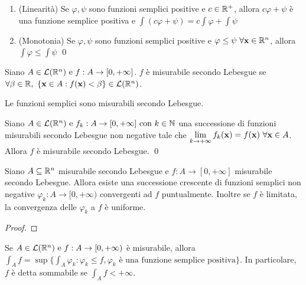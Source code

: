 \begin{theorem}
	\leavevmode
	\begin{enumerate}
		\item (Linearità) Se $\varphi,\psi$ sono funzioni semplici positive e $c\in \mathbb{R}^+$, allora $c\varphi + \psi$ è una funzione semplice positiva e $\int(c\varphi + \psi)=c\int\varphi +\int\psi$
		\item (Monotonia) Se $\varphi, \psi$ sono funzioni semplici positive e $\varphi \leq \psi \ \forall \vb{x} \in \mathbb{R}^n$, allora  $\int \varphi \leq \int \psi$
		\qed
	\end{enumerate}
\end{theorem}

\begin{definition}
	Siano $A \in \mathcal{L}(\mathbb{R}^n) \text{ e } f:A\to [0,+\infty]$. $f$ è misurabile secondo Lebesgue se $\forall \beta \in \mathbb{R}, \ \{\vb{x}\in A:f(\vb{x})<\beta\} \in \mathcal{L}(\mathbb{R}^n)$.
\end{definition}

\begin{remark}
	Le funzioni semplici sono misurabili secondo Lebesgue.
\end{remark}

\begin{theorem}
	Siano $A \in \mathcal{L}(\mathbb{R}^n) \text{ e } f_k:A \to [0,+\infty] \text{ con } k\in \mathbb{N}$ una successione di funzioni misurabili secondo Lebesgue non negative tale che $\lim\limits_{k\to +\infty}f_k(\vb{x})=f(\vb{x}) \ \forall \vb{x} \in A$. Allora $f$ è misurabile secondo Lebesgue.
	\qed
\end{theorem}

\begin{theorem}
	Siano $A \subseteq \mathbb{R}^n$ misurabile secondo Lebesgue e $f:A\to [0,+\infty]$ misurabile secondo Lebesgue. Allora esiste una successione crescente di funzioni semplici non negative $\varphi_k:A\to [0,+\infty)$ convergenti ad $f$ puntualmente. Inoltre se $f$ è limitata, la convergenza delle $\varphi_k$ a $f$ è uniforme.
\end{theorem}

\begin{proof}
\end{proof}

\begin{definition}
	Se $A\in \mathcal{L}(\mathbb{R}^n) \text{ e } f:A\to [0,+\infty)$ è misurabile, allora $\int_Af=\sup\{\int_A \varphi_k:\varphi_k \leq f, \varphi_k \text{ è una funzione semplice positiva}\}$. In particolare, $f$ è detta sommabile se $\int_A f<+\infty$.
\end{definition}